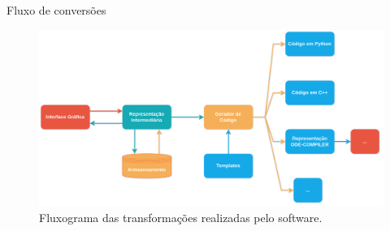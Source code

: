 \begin{frame}{Fluxo de conversões}
    \begin{figure}
        \centering
        \includegraphics[width=\textwidth, height=\textheight, keepaspectratio=true]{beamerthemesrc/images/fluxo-conversoes.png}
        \caption{Fluxograma das transformações realizadas pelo software.}
    \end{figure}
\end{frame}
